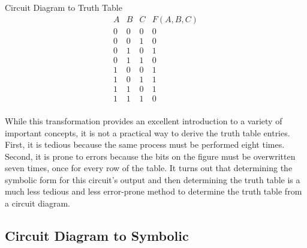 \begin{process}{Circuit Diagram to Truth Table}
$$\begin{array}{c|c|c||c}
A & B & C & F(A,B,C) \\ \hline \hline
0 & 0 & 0 & 0  \\ \hline
0 & 0 & 1 & 0  \\ \hline
0 & 1 & 0 & 1  \\ \hline
0 & 1 & 1 & 0  \\ \hline
1 & 0 & 0 & 1  \\ \hline
1 & 0 & 1 & 1  \\ \hline
1 & 1 & 0 & 1  \\ \hline
1 & 1 & 1 & 0  \\
\end{array}$$
\end{process}

While this transformation provides an excellent introduction to a variety
of important concepts, it is not a practical way to derive the truth table 
entries.  First, it is tedious because the same process must be performed 
eight times.  Second, it is prone to errors because the bits on the figure
must be overwritten seven times, once for every row of the table. 
It turns out that determining the symbolic
form for this circuit's output and then determining the truth table is a
much less tedious and less error-prone method to determine the truth table
from a circuit diagram.

\subsection{Circuit Diagram to Symbolic}

